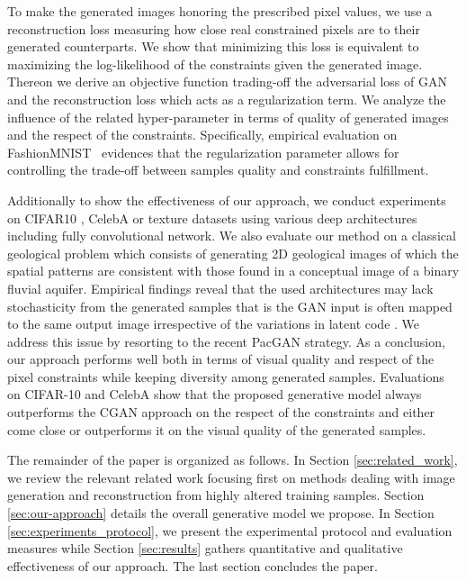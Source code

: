 To make the generated images honoring the prescribed pixel values, we use a reconstruction loss measuring how close real constrained pixels are to their generated counterparts. We show that minimizing this loss is equivalent to maximizing the log-likelihood of the constraints given the generated image. Thereon we derive an objective function trading-off the adversarial loss of GAN and the reconstruction loss which acts as a regularization term. We analyze the influence of the related hyper-parameter in terms of quality of generated images and the respect of the constraints. Specifically, empirical evaluation on FashionMNIST~\citep{Xiao2017} evidences that the regularization parameter allows for controlling the trade-off between samples quality and constraints fulfillment.

Additionally to show the effectiveness of our approach, we conduct experiments on CIFAR10 \citep{Krizhevsky2009}, CelebA \citep{Liu2015} or texture \citep{Jetchev2017} datasets using various deep architectures including fully convolutional network. We also evaluate our method on a classical geological problem which consists of generating 2D geological images of which the spatial patterns are consistent with those found in a conceptual image of a binary fluvial aquifer\citep{Strebelle2002}\citep{Laloy2018}. Empirical findings reveal that the used architectures may lack stochasticity from the generated samples that is the GAN input is often mapped to the same output image irrespective of the variations in latent code \citep{Yang2019}. We address this issue by resorting to the recent PacGAN \citep{Lin2018} strategy.
As a conclusion, our approach performs well both in terms of visual quality and respect of the pixel constraints while keeping diversity among generated samples. Evaluations on CIFAR-10 and CelebA show that the proposed generative model always outperforms the CGAN approach on the respect of the constraints and either come close or outperforms it on the visual quality of the generated samples.

The remainder of the paper is organized as follows. In Section \ref{sec:related_work}, we review the relevant related  work focusing first on methods dealing with image generation and reconstruction from highly altered training samples.  Section \ref{sec:our-approach}  details the overall generative model we propose. In Section \ref{sec:experiments_protocol}, we present the experimental protocol and evaluation measures while Section \ref{sec:results} gathers quantitative and qualitative effectiveness of our approach. The last section concludes the paper.

